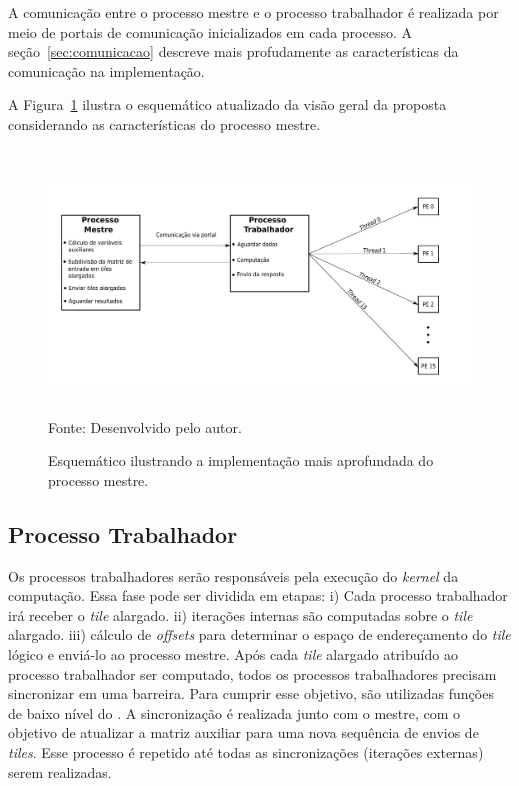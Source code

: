 A comunicação entre o processo mestre e o processo trabalhador é realizada por
meio de portais de comunicação inicializados em cada processo. A
seção~\ref{sec:comunicacao} descreve mais profudamente as características da
comunicação na implementação.

A Figura~\ref{fig:visaoGeralMestre} ilustra o esquemático atualizado da visão geral
da proposta considerando as características do processo mestre.


\begin{figure}[!h]
	\centering
    \caption{Esquemático ilustrando a implementação mais aprofundada do processo mestre.}
    \includegraphics[width=1.2\textwidth, height=7cm]{figs/visaoGeralPSKELMPPAMestre.pdf} \\
    Fonte: Desenvolvido pelo autor.
    \label{fig:visaoGeralMestre}
\end{figure}



\subsection{Processo Trabalhador}
Os processos trabalhadores serão responsáveis pela
execução do \textit{kernel} da computação. Essa fase pode ser dividida em
etapas: i) Cada processo trabalhador irá receber o \textit{tile} alargado.
ii) iterações internas são computadas sobre o \textit{tile} alargado. iii)
cálculo de \textit{offsets} para determinar o espaço de endereçamento do
\textit{tile} lógico e enviá-lo ao processo mestre. Após cada \textit{tile}
alargado atribuído ao processo trabalhador ser computado, todos os processos
trabalhadores precisam sincronizar em uma barreira. Para cumprir esse objetivo,
são utilizadas funções de baixo nível do \mppa. A sincronização é realizada
junto com o mestre, com o objetivo de atualizar a matriz auxiliar para uma nova
sequência de envios de \textit{tiles}. Esse processo é repetido até
todas as sincronizações (iterações externas) serem realizadas.

